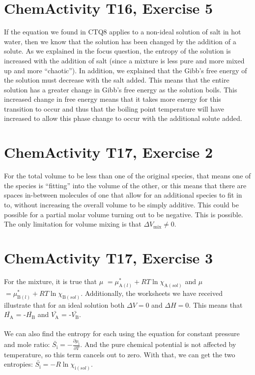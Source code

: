 \section{ChemActivity T16, Exercise 5}
If the equation we found in CTQ8 applies to a non-ideal solution of salt in hot water, then we know that the solution has been changed by the addition of a solute. As we explained in the focus question, the entropy of the solution is increased with the addition of salt (since a mixture is less pure and more mixed up and more ``chaotic''). In addition, we explained that the Gibb's free energy of the solution must decrease with the salt added. This means that the entire solution has a greater change in Gibb's free energy as the solution boils. This increased change in free energy means that it takes more energy for this transition to occur and thus that the boiling point temperature will have increased to allow this phase change to occur with the additional solute added.

\section{ChemActivity T17, Exercise 2}
For the total volume to be less than one of the original species, that means one of the species is ``fitting'' into the volume of the other, or this means that there are spaces in-between molecules of one that allow for an additional species to fit in to, without increasing the overall volume to be simply additive. This could be possible for a partial molar volume turning out to be negative. This is possible. The only limitation for volume mixing is that $\Delta V_\textrm{mix} \neq 0$.

\section{ChemActivity T17, Exercise 3}
For the mixture, it is true that $\mu$ $= \mu^*_{\textrm{A}(l)} + RT \ln{\chi_{\textrm{A}(sol)}}$ and $\mu$ $= \mu^*_{\textrm{B}(l)} + RT \ln{\chi_{\textrm{B}(sol)}}$. Additionally, the worksheets we have received illustrate that for an ideal solution both $\Delta$$V = 0$ and $\Delta$$H = 0$. This means that $\bar{H_{\textrm{A}}}$ = -$\bar{H_{\textrm{B}}}$ and $\bar{V_{\textrm{A}}}$ = -$\bar{V_{\textrm{B}}}$. \\ \\
We can also find the entropy for each using the equation for constant pressure and mole ratio: $\bar{S_\textrm{i}} = -\frac{\partial\mu_\textrm{i}}{\partial T}$. And the pure chemical potential is not affected by temperature, so this term cancels out to zero. With that, we can get the two entropies: $\bar{S_\textrm{i}} = -R \ln{\chi_{\textrm{i}(sol)}}$.

